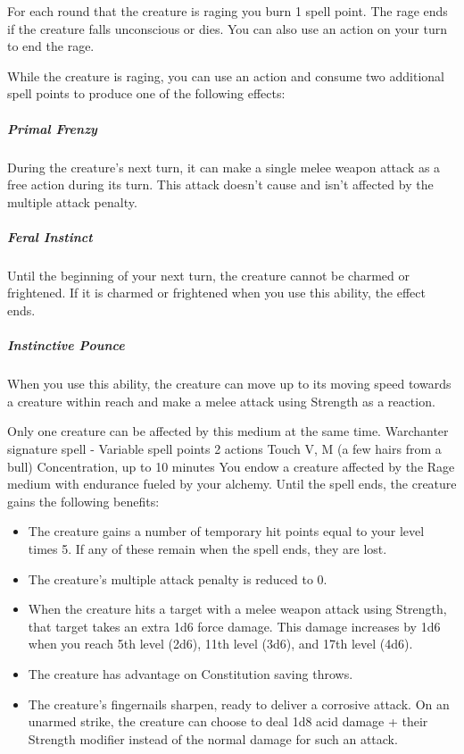         For each round that the creature is raging you burn 1 spell point.
        The rage ends if the creature falls unconscious or dies.
        You can also use an action on your turn to end the rage.

        While the creature is raging, you can use an action and consume two additional spell points to produce one of the following effects:

        \subparagraph{Primal Frenzy}
        During the creature's next turn, it can make a single melee weapon attack as a free action during its turn.
        This attack doesn't cause and isn't affected by the multiple attack penalty.
        \subparagraph{Feral Instinct}
        Until the beginning of your next turn, the creature cannot be charmed or frightened.
        If it is charmed or frightened when you use this ability, the effect ends.
        \subparagraph{Instinctive Pounce}
        When you use this ability, the creature can move up to its moving speed towards a creature within reach and make a melee attack using Strength as a reaction.

        Only one creature can be affected by this medium at the same time.
        {Warchanter signature spell - Variable spell points}
        {2 actions}
        {Touch}
        {V, M (a few hairs from a bull)}
        {Concentration, up to 10 minutes}
        You endow a creature affected by the Rage medium with endurance fueled by your alchemy.
        Until the spell ends, the creature gains the following benefits:

        \begin{itemize}
            \item The creature gains a number of temporary hit points equal to your level times 5.
            If any of these remain when the spell ends, they are lost.
            \item The creature's multiple attack penalty is reduced to 0.
            \item When the creature hits a target with a melee weapon attack using Strength, that target takes an extra 1d6 force damage.
            This damage increases by 1d6 when you reach 5th level (2d6), 11th level (3d6), and 17th level (4d6).
            \item The creature has advantage on Constitution saving throws.
            \item The creature's fingernails sharpen, ready to deliver a corrosive attack.
            On an unarmed strike, the creature can choose to deal 1d8 acid damage + their Strength modifier instead of the normal damage for such an attack.
        \end{itemize}

